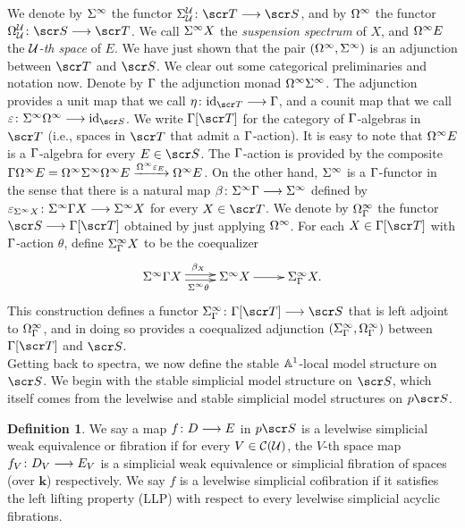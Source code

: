 \documentclass{amsart}
\theoremstyle{definition}
\newtheorem{defn}{Definition}[section]
\newcommand{\bk}{\mathbf{k}}
\begin{document}
We denote by $\Sigma^{\infty}$ the functor $\SI^{\oU}_{\oU} \colon \sT \rtarr \sS$, and by $\Omega^{\infty}$ the functor $\OM^{\oU}_{\oU} \colon \sS \rtarr \sT$. We call $\Sigma^{\infty} X$ the \emph{suspension spectrum} of $X$, and $\Omega^{\infty}E$ the \emph{${\mathcal{U}}$-th space} of $E$. We have just shown that the pair $(\Omega^{\infty},\Sigma^{\infty})$ is an adjunction between $\sT$ and $\sS$. We clear out some categorical preliminaries and notation now. Denote by $\Gamma$ the adjunction monad $\Omega^{\infty}\Sigma^{\infty}$. The adjunction provides a unit map that we call $\eta \colon \mathrm{id}_{\sT} \rtarr \GA$, and a counit map that we call $\epz \colon \SI^{\infty}\OM^{\infty} \rtarr \mathrm{id}_{\sS}$. We write $\GA[\sT]$ for the category of $\Gamma$-algebras in $\sT$ (i.e., spaces in $\sT$ that admit a $\Gamma$-action). It is easy to note that $\Omega^{\infty} E$ is a $\Gamma$-algebra for every $E \in \sS$. The $\Gamma$-action is provided by the composite $\Gamma \Omega^{\infty} E = \Omega^{\infty} \Sigma^{\infty} \Omega^{\infty} E \xrightarrow{\Omega^{\infty}\varepsilon_E} \Omega^{\infty}E$. On the other hand, $\Sigma^{\infty}$ is a $\Gamma$-functor in the sense that there is a natural map $\beta \colon \Sigma^{\infty} \Gamma \longrightarrow \Sigma^{\infty}$ defined by $\varepsilon_{\Sigma^{\infty}X} \colon \Sigma^{\infty} \Gamma X \longrightarrow \Sigma^{\infty} X$ for every $X \in \sT$. We denote by $\Omega^{\infty}_{\Gamma}$ the functor $\sS \rtarr \GA[\sT]$ obtained by just applying $\Omega^{\infty}$. For each $X \in \GA[\sT]$ with $\Gamma$-action $\theta$, define $\Sigma^{\infty}_{\Gamma}X$ to be the coequalizer \[\xymatrix{
\SI^{\infty}\GA X \ar@<-0.5ex>[r]_{\SI^{\infty}\theta} \ar@<0.5ex>[r]^{\beta_X} & \SI^{\infty}X \ar[r]& \SI^{\infty}_{\GA}X.
}\]
\noindent This construction defines a functor $\SI^{\infty}_{\GA} \colon \GA[\sT] \rtarr \sS$ that is left adjoint to $\Omega^{\infty}_{\Gamma}$, and in doing so provides a coequalized adjunction $(\Sigma^{\infty}_{\Gamma},\Omega^{\infty}_{\Gamma})$ between $\GA[\sT]$ and $\sS$.\\

Getting back to spectra, we now define the stable $\mathbb{A}^1$-local model structure on $\sS$. We begin with the stable simplicial model structure on $\sS$, which itself comes from the levelwise and stable simplicial model structures on $p\sS$. 

\begin{defn}
We say a map $f \colon D \longrightarrow E$ in $p\sS$ is a levelwise simplicial weak equivalence or fibration if for every $V \in {\mathcal{C}}({\mathcal{U}})$, the $V$-th space map $f_V \colon D_V \longrightarrow E_V$ is a simplicial weak equivalence or simplicial fibration of spaces (over $\bk$) respectively. We say $f$ is a levelwise simplicial cofibration if it satisfies the left lifting property (LLP) with respect to every levelwise simplicial acyclic fibrations. 
\end{defn}
\end{document}
